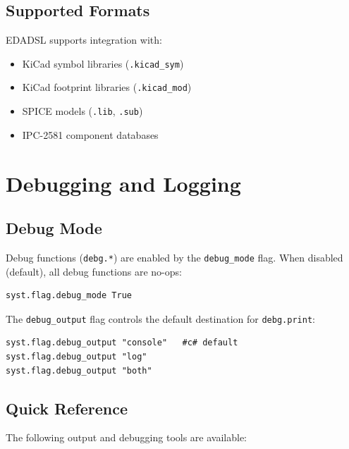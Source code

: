 \section{Supported Formats}
EDADSL supports integration with:
\begin{itemize}
\item KiCad symbol libraries (\texttt{.kicad\_sym})
\item KiCad footprint libraries (\texttt{.kicad\_mod})
\item SPICE models (\texttt{.lib}, \texttt{.sub})
\item IPC-2581 component databases
\end{itemize}


\chapter{Debugging and Logging}

\section{Debug Mode}
Debug functions (\texttt{debg.*}) are enabled by the \texttt{debug\_mode} flag. When disabled (default), all debug functions are no-ops:
\begin{verbatim}
syst.flag.debug_mode True
\end{verbatim}

The \texttt{debug\_output} flag controls the default destination for \texttt{debg.print}:
\begin{verbatim}
syst.flag.debug_output "console"   #c# default
syst.flag.debug_output "log"
syst.flag.debug_output "both"
\end{verbatim}

\section{Quick Reference}
The following output and debugging tools are available:

